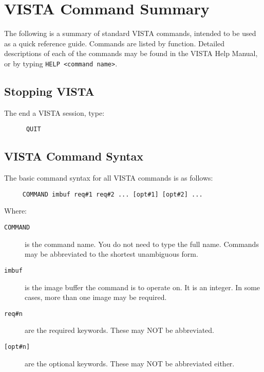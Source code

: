 %
%
%
%
%
%

%
%
%
%
%
%

\chapter{VISTA Command Summary}

The following is a summary of standard VISTA commands, intended to be used as
a quick reference guide.  Commands are listed by function.  Detailed
descriptions of each of the commands may be found in the VISTA Help Manual, or
by typing \verb+HELP <command name>+.


\section{Stopping VISTA}

The end a VISTA session, type:
\begin{verbatim}
      QUIT
\end{verbatim}


\section{VISTA Command Syntax}

The basic command syntax for all VISTA commands is as follows:
\begin{verbatim}
     COMMAND imbuf req#1 req#2 ... [opt#1] [opt#2] ...
\end{verbatim}
Where:
\begin{description}
      \item[{\tt COMMAND}] is the command name.  You do not need to type
            the full name.  Commands may be abbreviated to the shortest
            unambiguous form.
      \item[{\tt imbuf}]   is the image buffer the command is to operate
            on.  It is an integer.  In some cases, more than one image may
            be required.
      \item[{\tt req\#n}] are the required keywords.  These may NOT be
            abbreviated.
      \item[{\tt [opt\#n]}] are the optional keywords.  These may NOT
            be abbreviated either.
\end{description}

